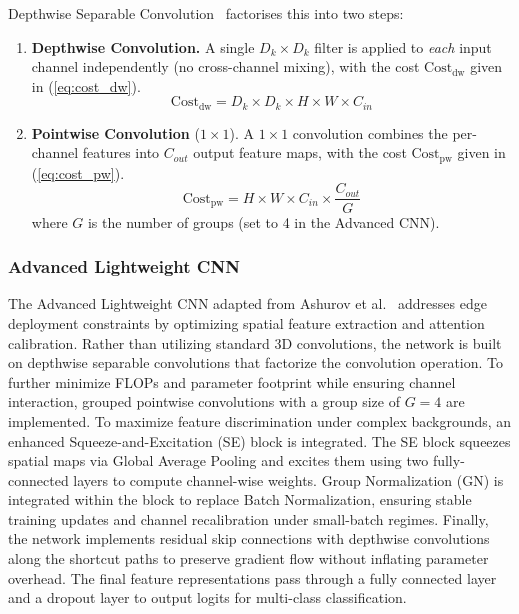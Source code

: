 \documentclass[10pt, conference]{IEEEtran}
\begin{document}
Depthwise Separable Convolution~\cite{ashurov2025} factorises this into two steps:

\begin{enumerate}
    \item \textbf{Depthwise Convolution.}
          A single $D_k \times D_k$ filter is applied to \emph{each} input channel
          independently (no cross-channel mixing), with the cost $\text{Cost}_{\text{dw}}$ given in (\ref{eq:cost_dw}).
          \begin{equation}
              \label{eq:cost_dw}
              \text{Cost}_{\text{dw}} = D_k \times D_k \times H \times W \times C_{in}
          \end{equation}

    \item \textbf{Pointwise Convolution} ($1{\times}1$).
          A $1\times1$ convolution combines the per-channel features into $C_{out}$
          output feature maps, with the cost $\text{Cost}_{\text{pw}}$ given in (\ref{eq:cost_pw}).
          \begin{equation}
              \label{eq:cost_pw}
              \text{Cost}_{\text{pw}} = H \times W \times C_{in} \times
              \frac{C_{out}}{G}
          \end{equation}
          where $G$ is the number of groups (set to 4 in the Advanced CNN).
\end{enumerate}

\subsubsection{Advanced Lightweight CNN}
\label{subsec:advanced_cnn}

The Advanced Lightweight CNN adapted from Ashurov et al.~\cite{ashurov2025} addresses edge deployment constraints by optimizing spatial feature extraction and attention calibration. Rather than utilizing standard 3D convolutions, the network is built on depthwise separable convolutions that factorize the convolution operation. To further minimize FLOPs and parameter footprint while ensuring channel interaction, grouped pointwise convolutions with a group size of $G=4$ are implemented.
To maximize feature discrimination under complex backgrounds, an enhanced Squeeze-and-Excitation (SE) block is integrated. The SE block squeezes spatial maps via Global Average Pooling and excites them using two fully-connected layers to compute channel-wise weights. Group Normalization (GN) is integrated within the block to replace Batch Normalization, ensuring stable training updates and channel recalibration under small-batch regimes. Finally, the network implements residual skip connections with depthwise convolutions along the shortcut paths to preserve gradient flow without inflating parameter overhead. The final feature representations pass through a fully connected layer and a dropout layer to output logits for multi-class classification.
\end{document}
